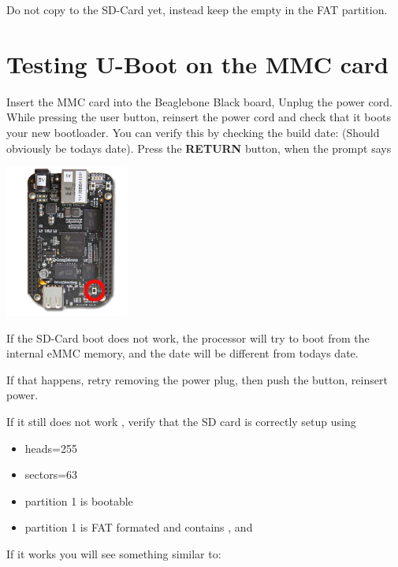 Do not copy  to the SD-Card yet, instead keep the empty 
 in the FAT partition.

\clearpage

\section{Testing U-Boot on the MMC card}

Insert the MMC card into the Beaglebone Black board, Unplug the power cord.
While pressing the user button, reinsert the power cord and check that it boots your new bootloader. 
You can verify this by checking the build date: (Should obviously be todays date). 
Press the {\bf RETURN} button, when the prompt says 

\begin{center}
    \includegraphics[height=5cm]{labs/sysdev-u-boot-BBB/beagleboneblack-user-button.png}
\end{center}

If the SD-Card boot does not work, the processor will try to boot from the internal eMMC memory,
and the date will be different from todays date.

If that happens, retry removing the power plug, then push the button, reinsert power.

If it still does not work , verify that the SD card is correctly setup using  

\begin{itemize}
\item heads=255
\item sectors=63
\item partition 1 is bootable
\item partition 1 is FAT formated and contains ,  and 
\end{itemize}


\clearpage

If it works you will see something similar to:

